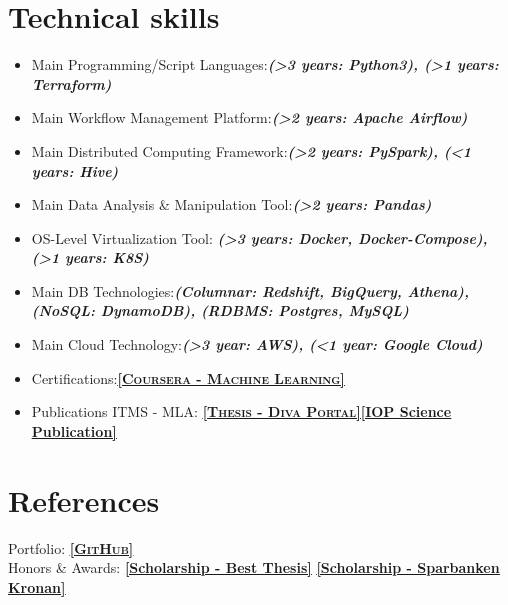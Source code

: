 \documentclass[10pt,a4paper,sans,colorlinks,linkcolor=blue,urlcolor=blue]{moderncv}
\begin{document}
\section{Technical skills}
\begin{itemize}
    \item Main Programming/Script Languages:\textbf{\textit{(>3 years: Python3), (>1 years: Terraform)}}
    \item Main Workflow Management Platform:\textbf{\textit{(>2 years: Apache Airflow)}}
    \item Main Distributed Computing Framework:\textbf{\textit{(>2 years: PySpark), (<1 years: Hive)}}
    \item Main Data Analysis \& Manipulation Tool:\textbf{\textit{(>2 years: Pandas)}}
    \item OS-Level Virtualization Tool: \textbf{\textit{(>3 years: Docker, Docker-Compose), (>1 years: K8S)}}
    \item Main DB Technologies:\textbf{\textit{(Columnar: Redshift, BigQuery, Athena), (NoSQL: DynamoDB), (RDBMS: Postgres, MySQL)}}
    \item Main Cloud Technology:\textbf{\textit{(>3 year: AWS), (<1 year: Google Cloud)}}
    \item Certifications:\href{https://www.coursera.org/account/accomplishments/certificate/W5HM63ABYCDV}{\textbf{\textsc{\underline{[Coursera - Machine Learning]}}}}
    \item Publications ITMS - MLA\footnotemark[2]: \href{http://hh.diva-portal.org/smash/record.jsf?pid=diva2%3A1113511&dswid=4291#sthash.wwKv4JYI.dpbs}{\textbf{\textsc{\underline{[Thesis - Diva Portal]}}}}\href{http://iopscience.iop.org/article/10.1088/1757-899X/252/1/012018/pdf;jsessionid=EF9A9E415EC41D639019919DC566B21F.c4.iopscience.cld.iop.org}{\textbf{\underline{[IOP Science Publication]}}}
\end{itemize}
\section{References}
Portfolio: \underline{\href{https://github.com/Thelin90}{\textbf{\textsc{[GitHub]}}}}\\
Honors \& Awards: \href{https://www.hms-networks.com/work/in/sweden/hms-scholarship}{\textbf{\underline{[Scholarship - Best Thesis]}}} \href{http://www.hh.se/omhogskolan/aktuellt/nyheter/nyheter/studenterbelonasavsparbanksstiftelsenkronan.65446700.html}{\textbf{\underline{[Scholarship - Sparbanken Kronan]}}}

     
     
\vfill
\enlargethispage{\footskip}
\end{document}
